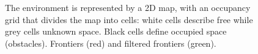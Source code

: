 \begin{figure}[t!]
	\centering
	\caption {The environment is represented by a 2D map, with an occupancy grid that divides the map into cells: white cells describe free while grey cells unknown space. Black cells define occupied space (obstacles). Frontiers (red) and filtered frontiers (green).}
	\label{fig:environment}
\end{figure}



